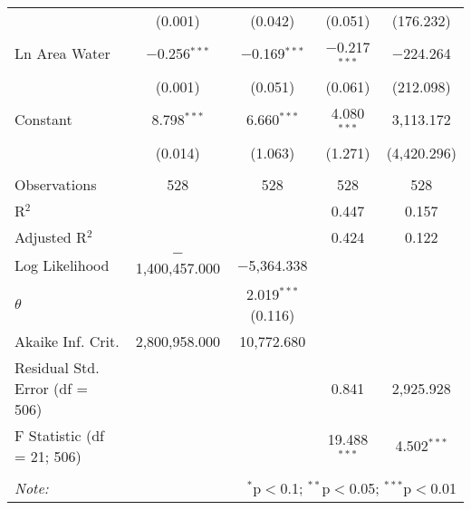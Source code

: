 \begin{table}[!htbp]
\begin{tabular}{@{\extracolsep{5pt}}lcccc}
  & (0.001) & (0.042) & (0.051) & (176.232) \\ 
  Ln Area Water & $-$0.256$^{***}$ & $-$0.169$^{***}$ & $-$0.217$^{***}$ & $-$224.264 \\ 
  & (0.001) & (0.051) & (0.061) & (212.098) \\ 
  Constant & 8.798$^{***}$ & 6.660$^{***}$ & 4.080$^{***}$ & 3,113.172 \\ 
  & (0.014) & (1.063) & (1.271) & (4,420.296) \\ 
 \hline \\[-1.8ex] 
Observations & 528 & 528 & 528 & 528 \\ 
R$^{2}$ &  &  & 0.447 & 0.157 \\ 
Adjusted R$^{2}$ &  &  & 0.424 & 0.122 \\ 
Log Likelihood & $-$1,400,457.000 & $-$5,364.338 &  &  \\ 
$\theta$ &  & 2.019$^{***}$  (0.116) &  &  \\ 
Akaike Inf. Crit. & 2,800,958.000 & 10,772.680 &  &  \\ 
Residual Std. Error (df = 506) &  &  & 0.841 & 2,925.928 \\ 
F Statistic (df = 21; 506) &  &  & 19.488$^{***}$ & 4.502$^{***}$ \\ 
\hline 
\hline \\[-1.8ex] 
\textit{Note:}  & \multicolumn{4}{r}{$^{*}$p$<$0.1; $^{**}$p$<$0.05; $^{***}$p$<$0.01} \\ 
\end{tabular} 
\end{table} 
